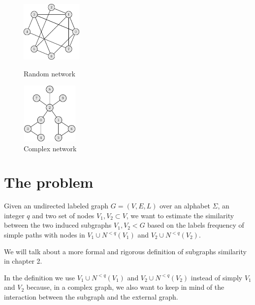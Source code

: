 \begin{figure}[h]
	\centering
	\begin{minipage}[t]{.45\textwidth}
		\centering
		\includegraphics[width=3cm,height=3cm]{figure/figure-1-3}
		\caption{Random network}
	\end{minipage}\hfill
	\begin{minipage}[t]{.45\textwidth}
		\centering
		\includegraphics[width=2.8cm,height=3cm]{figure/figure-1-4}
		\caption{Complex network}
	\end{minipage}
\end{figure}

\clearpage
\section{The problem}

\begin{problema}
Given an undirected labeled graph $G=(V,E,L)$ over an alphabet $\Sigma$, an integer $q$
and two set of nodes $V_{1}, V_{2} \subset V$, we want to estimate the similarity between the two induced subgraphs $V_{1}, V_{2} < G$ based on the labels frequency of simple paths with nodes in $V_{1} \cup N^{<q}(V_{1})$ and $V_{2} \cup N^{<q}(V_{2})$.
\end{problema}

We will talk about a more formal and rigorous definition of subgraphs similarity in chapter 2.\medskip

In the definition we use $V_{1} \cup N^{<q}(V_{1})$ and $V_{2} \cup N^{<q}(V_{2})$ instead of simply $V_{1}$ and $V_{2}$ because, in a complex graph, we also want to keep in mind of the interaction between the subgraph and the external graph.\medskip

